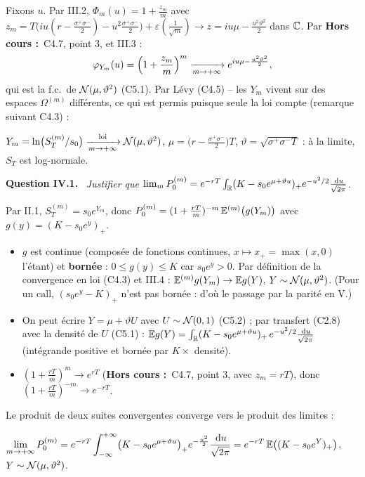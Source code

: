\documentclass[11pt,a4paper]{article}
\newcommand{\question}[1]{\par\medskip\noindent\textbf{Question #1.}~}
\newcommand{\partie}[1]{\par\medskip\noindent{\bfseries Partie #1}\par\nopagebreak}
\newcommand{\hc}{\textbf{Hors cours :}~}
\newcommand{\Em}{\E^{(m)}}
\begin{document}
\begin{exo}
Fixons $u$. Par III.2, $\Phi_m(u)=1+\frac{z_m}m$ avec
$z_m=T\bigl(iu(r-\frac{\sigma^+\sigma^-}2)-u^2\frac{\sigma^+\sigma^-}2\bigr)+\varepsilon(\frac1{\sqrt m})\to z=iu\mu-\frac{u^2\vartheta^2}2$ dans $\mathbb{C}$.
Par \hc C4.7, point 3, et III.3 :
\[\varphi_{Y_m}(u)=\Bigl(1+\frac{z_m}m\Bigr)^m\xrightarrow[m\to+\infty]{}e^{iu\mu-\frac{u^2\vartheta^2}2},\]
qui est la f.c.\ de $\mathcal{N}(\mu,\vartheta^2)$ (C5.1). Par Lévy (C4.5) -- les $Y_m$ vivent sur des espaces $\Omega^{(m)}$ différents, ce qui est
permis puisque seule la loi compte (remarque suivant C4.3) :
\begin{resultat}
$Y_m=\ln\bigl(S^{(m)}_T/s_0\bigr)\xrightarrow[m\to+\infty]{\text{loi}}\mathcal{N}(\mu,\vartheta^2)$, $\mu=\bigl(r-\frac{\sigma^+\sigma^-}2\bigr)T$,
$\vartheta=\sqrt{\sigma^+\sigma^-T}$ : à la limite, $S_T$ est log-normale.
\end{resultat}

\partie{IV -- Prix limite du put}

\question{IV.1} \emph{Justifier que $\lim_mP^{(m)}_0=e^{-rT}\int_{\mathbb{R}}(K-s_0e^{\mu+\vartheta u})_+e^{-u^2/2}\frac{\,\mathrm{d} u}{\sqrt{2\pi}}$.}

Par II.1, $S^{(m)}_T=s_0e^{Y_m}$, donc $P^{(m)}_0=(1+\frac{rT}m)^{-m}\,\Em\bigl(g(Y_m)\bigr)$ avec $g(y)=(K-s_0e^y)_+$.
\begin{itemize}
  \item $g$ est continue (composée de fonctions continues, $x\mapsto x_+=\max(x,0)$ l'étant) et \textbf{bornée} : $0\le g(y)\le K$ car $s_0e^y>0$.
  Par définition de la convergence en loi (C4.3) et III.4 : $\Em g(Y_m)\to\E g(Y)$, $Y\sim\mathcal{N}(\mu,\vartheta^2)$. (Pour un call, $(s_0e^y-K)_+$ n'est
  pas bornée : d'où le passage par la parité en V.)
  \item On peut écrire $Y=\mu+\vartheta U$ avec $U\sim\mathcal{N}(0,1)$ (C5.2) ; par transfert (C2.8) avec la densité de $U$ (C5.1) :
  $\mathbb{E} g(Y)=\int_{\mathbb{R}}(K-s_0e^{\mu+\vartheta u})_+\,e^{-u^2/2}\frac{\,\mathrm{d} u}{\sqrt{2\pi}}$ (intégrande positive et bornée par $K\times$ densité).
  \item $(1+\frac{rT}m)^m\to e^{rT}$ (\hc C4.7, point 3, avec $z_m=rT$), donc $(1+\frac{rT}m)^{-m}\to e^{-rT}$.
\end{itemize}
Le produit de deux suites convergentes converge vers le produit des limites :
\begin{resultat}
$\displaystyle\lim_{m\to+\infty}P^{(m)}_0=e^{-rT}\int_{-\infty}^{+\infty}\bigl(K-s_0e^{\mu+\vartheta u}\bigr)_+e^{-\frac{u^2}2}\frac{\,\mathrm{d} u}{\sqrt{2\pi}}
=e^{-rT}\,\mathbb{E}\bigl((K-s_0e^{Y})_+\bigr)$, $Y\sim\mathcal{N}(\mu,\vartheta^2)$.
\end{resultat}


\end{exo}
\end{document}
